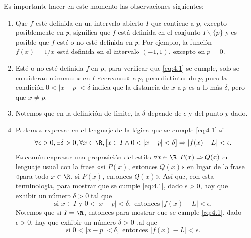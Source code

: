 \documentclass[12pt,a4paper]{book}
\begin{document}
    \begin{observacion}\label{obs:8}
        Es importante hacer en este momento las observaciones
        siguientes:
        \begin{enumerate}[label=\arabic*.]
            \item Que $f$ esté definida en un intervalo abierto $I$ que contiene a $p$, excepto
            posiblemente en $p$, significa que $f$ está definida en el conjunto $I\backslash\{p\}$ y
            es posible que $f$ esté o no esté definida en $p$. Por ejemplo, la función
            $f(x)=1/x$ está definida en el intervalo $(-1,1)$, excepto en $p=0$.
            \item Esté o no esté definida $f$ en $p$, para verificar que \eqref{eq:4.1} se cumple, solo se
            consideran números $x$ en $I$ «cercanos» a $p$, pero distintos de $p$, pues la
            condición $0<|x-p|<\delta$ indica que la distancia de $x$ a $p$ es a lo más $\delta$,
            pero que $x\neq p$.
            \item Notemos que en la definición de límite, la $\delta$ depende de $\epsilon$ y del punto $p$
            dado.
            \item Podemos expresar en el lenguaje de la lógica que se cumple \eqref{eq:4.1} si
            \begin{equation}\label{eq:4.2}
                \forall\epsilon>0,\exists\delta>0,\forall x\in\R,[x\in I\wedge 0<|x-p|<\delta]\Rightarrow|f(x)-L|<\epsilon.
            \end{equation}
            Es común expresar una proposición del estilo $\forall x\in\R,P(x)\Rightarrow Q(x)$ en
            lenguaje usual con la frase «si $P(x)$, entonces $Q(x)$» en lugar de la frase
            «para todo $x\in\R$, si $P(x)$, entonces $Q(x)$». Así que, con esta terminología,
            para mostrar que se cumple \eqref{eq:4.1}, dado $\epsilon>0$, hay que exhibir un
            número $\delta>0$ tal que
            \begin{equation*}
                \text{si }x\in I\text{ y }0<|x-p|<\delta,\text{ entonces }|f(x)-L|<\epsilon.
            \end{equation*}
            Notemos que si $I=\R$, entonces para mostrar que se cumple \eqref{eq:4.1}, dado
            $\epsilon>0$, hay que exhibir un número $\delta>0$ tal que
            \begin{equation*}
                \text{si }0<|x-p|<\delta,\text{ entonces }|f(x)-L|<\epsilon.
            \end{equation*}

\end{enumerate}
\end{observacion}
\end{document}
